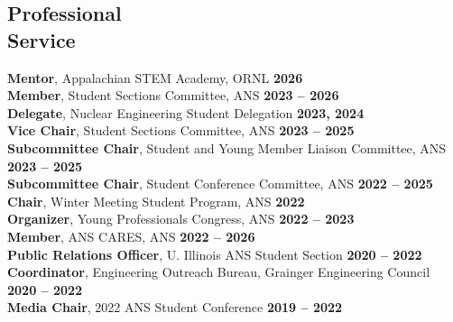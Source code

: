 \documentclass[margin,line]{resume}
\begin{document}
\begin{resume}
    \section{\mysidestyle Professional\\Service}
    \textbf{Mentor}, Appalachian STEM Academy, ORNL \hfill \textbf{2026}\vspace{.5mm}\\%
    \textbf{Member}, Student Sections Committee, ANS \hfill \textbf{2023 -- 2026}\vspace{.5mm}\\%
    \textbf{Delegate}, Nuclear Engineering Student Delegation \hfill \textbf{2023, 2024}\vspace{.5mm}\\%
    \textbf{Vice Chair}, Student Sections Committee, ANS \hfill \textbf{2023 -- 2025}\vspace{.5mm}\\%
    \textbf{Subcommittee Chair}, Student and Young Member Liaison Committee, ANS \hfill \textbf{2023 -- 2025}\vspace{.5mm}\\%
    \textbf{Subcommittee Chair}, Student Conference Committee, ANS \hfill \textbf{2022 -- 2025}\vspace{.5mm}\\%
    \textbf{Chair}, Winter Meeting Student Program, ANS \hfill \textbf{2022}\vspace{.5mm}\\%
    \textbf{Organizer}, Young Professionals Congress, ANS \hfill \textbf{2022 -- 2023}\vspace{.5mm}\\%
    \textbf{Member}, ANS CARES, ANS \hfill \textbf{2022 -- 2026}\vspace{.5mm}\\%
    \textbf{Public Relations Officer}, U. Illinois ANS Student Section  \hfill \textbf{2020 -- 2022}\vspace{.5mm}\\%
    \textbf{Coordinator}, Engineering Outreach Bureau, Grainger Engineering Council \hfill \textbf{2020 -- 2022}\vspace{.5mm}\\%
    \textbf{Media Chair}, 2022 ANS Student Conference \hfill \textbf{2019 -- 2022}\vspace{.5mm}\\%

\end{resume}
\end{document}
